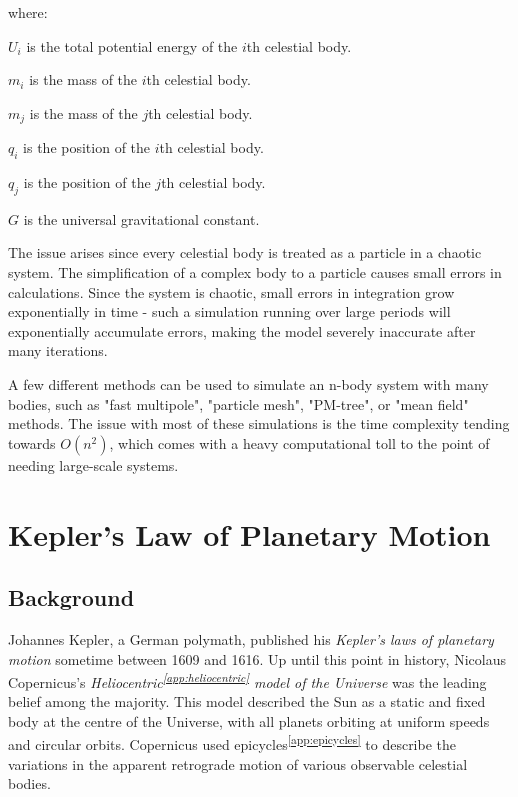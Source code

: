 \documentclass[12pt]{article}
\newcommand{\sref}[1]{\textsuperscript{\ref{#1}}}
\begin{document}
\begin{spacing}{1.25}
{    \noindent where:
    \begin{slist}
        \item \(U_i\) is the total potential energy of the \(i\)th celestial body.
        \item \(m_i\) is the mass of the \(i\)th celestial body.
        \item \(m_j\) is the mass of the \(j\)th celestial body.
        \item \(q_i\) is the position of the \(i\)th celestial body.
        \item \(q_j\) is the position of the \(j\)th celestial body.
        \item \(G\) is the universal gravitational constant.
    \end{slist}
}

\hfill
\par {   
    The issue arises since every celestial body is treated as a particle in a chaotic system. The simplification of a complex body to a particle causes small errors in calculations. Since the system is chaotic, small errors in integration grow exponentially in time - such a simulation running over large periods will exponentially accumulate errors, making the model severely inaccurate after many iterations.
}

\par {
    A few different methods can be used to simulate an n-body system with many bodies, such as "fast multipole", "particle mesh", "PM-tree", or "mean field" methods. The issue with most of these simulations is the time complexity tending towards \(O(n^2)\), which comes with a heavy computational toll to the point of needing large-scale systems.
}




\newpage
\section{Kepler's Law of Planetary Motion}
\subsection{Background}
\par {
    Johannes Kepler, a German polymath, published his \textit{Kepler's laws of planetary motion} sometime between 1609 and 1616. Up until this point in history, Nicolaus Copernicus's \textit{Heliocentric\sref{app:heliocentric} model of the Universe} was the leading belief among the majority. This model described the Sun as a static and fixed body at the centre of the Universe, with all planets orbiting at uniform speeds and circular orbits. Copernicus used epicycles\sref{app:epicycles} to describe the variations in the apparent retrograde motion of various observable celestial bodies.
}


\end{spacing}
\end{document}
